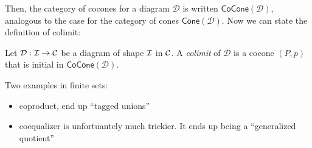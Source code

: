 Then, the category of cocones for a diagram $\mathcal{D}$ is 
written $\mathsf{CoCone}(\mathcal{D})$, analogous to the case for 
the category of cones
$\mathsf{Cone}(\mathcal{D})$. Now we can state the 
definition of colimit:

\begin{definition}[Colimit]
  Let $\mathcal D : \mathcal I \to \mathcal C$ be a diagram of shape $\mathcal I$ in 
  $\mathcal C$. A \emph{colimit} of $\mathcal{D}$ is a cocone 
  $(P, p)$ that is initial in $\mathsf{CoCone}(\mathcal{D})$.
\end{definition}

Two examples in finite sets:
\begin{itemize}
  \item coproduct, end up ``tagged unions''
  \item coequalizer is unfortuantely much trickier. It ends up being a
  ``generalized quotient''
\end{itemize}